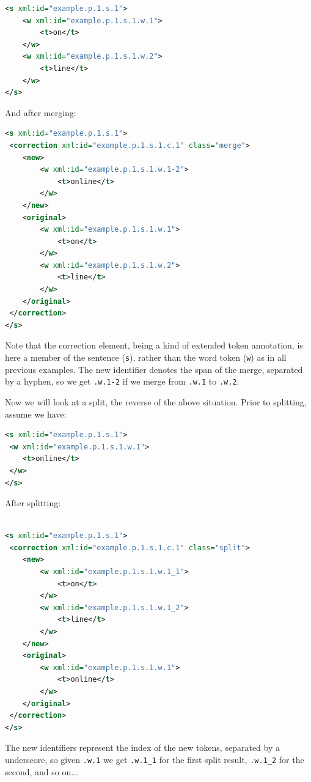\documentclass[a4paper,12pt]{report}
\begin{document}
\begin{lstlisting}[language=xml]
<s xml:id="example.p.1.s.1">
    <w xml:id="example.p.1.s.1.w.1">
        <t>on</t>
    </w>
    <w xml:id="example.p.1.s.1.w.2">
        <t>line</t>
    </w>                       
</s>  
\end{lstlisting}

And after merging:

\begin{lstlisting}[language=xml]
<s xml:id="example.p.1.s.1">
 <correction xml:id="example.p.1.s.1.c.1" class="merge">
    <new>
        <w xml:id="example.p.1.s.1.w.1-2">        
            <t>online</t>
        </w>
    </new>
    <original>
        <w xml:id="example.p.1.s.1.w.1">
            <t>on</t>
        </w>
        <w xml:id="example.p.1.s.1.w.2">
            <t>line</t>
        </w>                         
    </original>
 </correction>               
</s>
\end{lstlisting} 

Note that the correction element, being a kind of extended token annotation, is here a member of the sentence (\texttt{s}), rather than the word token (\texttt{w}) as in all previous examples. The new identifier denotes the span of the merge, separated by a hyphen, so we get \texttt{.w.1-2} if we merge from \texttt{.w.1} to \texttt{.w.2}.

Now we will look at a split, the reverse of the above situation. Prior to splitting, assume we have:

\begin{lstlisting}[language=xml]
<s xml:id="example.p.1.s.1">
 <w xml:id="example.p.1.s.1.w.1">
    <t>online</t>
 </w>                         
</s>
\end{lstlisting}

After splitting:

\begin{lstlisting}[language=xml]

<s xml:id="example.p.1.s.1">
 <correction xml:id="example.p.1.s.1.c.1" class="split">
    <new>    
        <w xml:id="example.p.1.s.1.w.1_1">
            <t>on</t>
        </w>
        <w xml:id="example.p.1.s.1.w.1_2">
            <t>line</t>
        </w>                        
    </new>
    <original>
        <w xml:id="example.p.1.s.1.w.1">
            <t>online</t>
        </w>
    </original>
 </correction>               
</s>
\end{lstlisting}

The new identifiers represent the index of the new tokens, separated by a underscore, so given \texttt{.w.1}  we get \texttt{.w.1\_1} for the first split result, \texttt{.w.1\_2} for the second, and so on...
\end{document}
